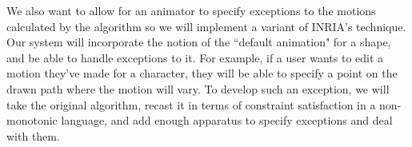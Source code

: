 We also want to allow for an animator to specify exceptions to the motions calculated by the algorithm so we will implement a variant of INRIA's technique. Our system will incorporate the notion of the ``default animation" for a shape, and be able to handle exceptions to it. For example, if a user wants to edit a motion they've made for a character, they will be able to specify a point on the drawn path where the motion will vary. To develop such an exception, we will take the original algorithm, recast it in  terms of constraint satisfaction in a non-monotonic language, and add enough apparatus to specify exceptions and deal with them.

